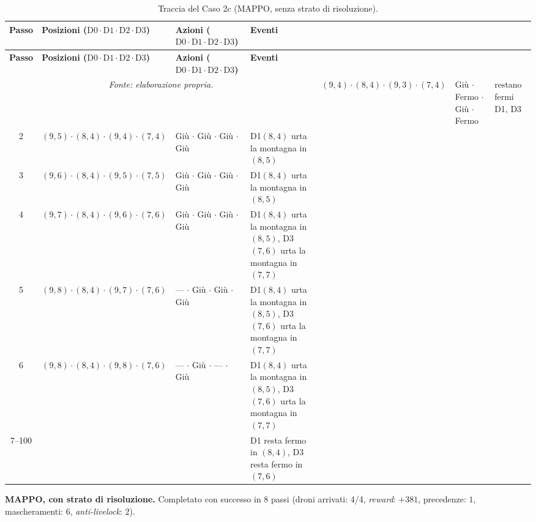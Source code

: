 \documentclass[12pt,a4paper,twoside]{report}
\begin{document}
{\footnotesize
\setlength{\tabcolsep}{3.5pt}
\begin{longtable}{c l l >{\raggedright\arraybackslash}p{3.8cm}}
\caption{Traccia del Caso 2c (MAPPO, senza strato di risoluzione).}\\
\toprule
\textbf{Passo} & \textbf{Posizioni ($\text{D0} \cdot \text{D1} \cdot \text{D2} \cdot \text{D3}$)} & \textbf{Azioni ($\text{D0} \cdot \text{D1} \cdot \text{D2} \cdot \text{D3}$)} & \textbf{Eventi} \\
\midrule
\endfirsthead
\toprule
\textbf{Passo} & \textbf{Posizioni ($\text{D0} \cdot \text{D1} \cdot \text{D2} \cdot \text{D3}$)} & \textbf{Azioni ($\text{D0} \cdot \text{D1} \cdot \text{D2} \cdot \text{D3}$)} & \textbf{Eventi} \\
\midrule
\endhead
\bottomrule
\multicolumn{4}{c}{\footnotesize\emph{Fonte: elaborazione propria.}}
\endlastfoot
1      & $(9, 4) \cdot (8, 4) \cdot (9, 3) \cdot (7, 4)$ & Giù $\cdot$ Fermo $\cdot$ Giù $\cdot$ Fermo & restano fermi D1, D3 \\
2      & $(9, 5) \cdot (8, 4) \cdot (9, 4) \cdot (7, 4)$ & Giù $\cdot$ Giù $\cdot$ Giù $\cdot$ Giù     & D1$(8, 4)$ urta la montagna in $(8, 5)$ \\
3      & $(9, 6) \cdot (8, 4) \cdot (9, 5) \cdot (7, 5)$ & Giù $\cdot$ Giù $\cdot$ Giù $\cdot$ Giù     & D1$(8, 4)$ urta la montagna in $(8, 5)$ \\
4      & $(9, 7) \cdot (8, 4) \cdot (9, 6) \cdot (7, 6)$ & Giù $\cdot$ Giù $\cdot$ Giù $\cdot$ Giù     & D1$(8, 4)$ urta la montagna in $(8, 5)$, D3$(7, 6)$ urta la montagna in $(7, 7)$ \\
5      & $(9, 8) \cdot (8, 4) \cdot (9, 7) \cdot (7, 6)$ & --- $\cdot$ Giù $\cdot$ Giù $\cdot$ Giù     & D1$(8, 4)$ urta la montagna in $(8, 5)$, D3$(7, 6)$ urta la montagna in $(7, 7)$ \\
6      & $(9, 8) \cdot (8, 4) \cdot (9, 8) \cdot (7, 6)$ & --- $\cdot$ Giù $\cdot$ --- $\cdot$ Giù     & D1$(8, 4)$ urta la montagna in $(8, 5)$, D3$(7, 6)$ urta la montagna in $(7, 7)$ \\*
7--100 & & & D1 resta fermo in $(8, 4)$, D3 resta fermo in $(7, 6)$ \\*
\end{longtable}
}

\noindent\textbf{MAPPO, con strato di risoluzione.} Completato con successo in $8$ passi (droni arrivati: 4/4, \emph{reward}: $+381$, precedenze: $1$, mascheramenti: $6$, \emph{anti-livelock}: $2$).
\end{document}
